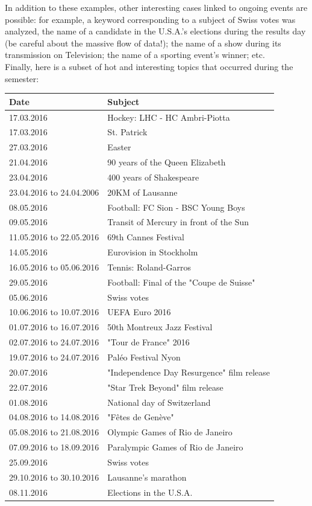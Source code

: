 \documentclass[a4paper,11pt]{report}
\begin{document}
In addition to these examples, other interesting cases linked to ongoing events are possible: for example, a keyword corresponding to a subject of Swiss votes was analyzed, the name of a candidate in the U.S.A.'s elections during the results day (be careful about the massive flow of data!); the name of a show during its transmission on Television; the name of a sporting event's winner; etc.\\

Finally, here is a subset of hot and interesting topics that occurred during the semester:
\vspace{-10pt}
\begin{center}
\def\arraystretch{1.5}
\begin{longtable}{|l|l|}\hline
	\textbf{Date} & \textbf{Subject}\\\hline \endhead
	17.03.2016 & Hockey: LHC - HC Ambri-Piotta\\\hline
	17.03.2016 & St. Patrick\\\hline
	27.03.2016 & Easter\\\hline
	21.04.2016 & 90 years of the Queen Elizabeth\\\hline
	23.04.2016 & 400 years of Shakespeare\\\hline
	23.04.2016 to 24.04.2006 & 20KM of Lausanne\\\hline
	08.05.2016 & Football: FC Sion - BSC Young Boys\\\hline
	09.05.2016 & Transit of Mercury in front of the Sun\\\hline
	11.05.2016 to 22.05.2016 & 69th Cannes Festival\\\hline
	14.05.2016 & Eurovision in Stockholm\\\hline
	16.05.2016 to 05.06.2016 & Tennis: Roland-Garros\\\hline
	29.05.2016 & Football: Final of the "Coupe de Suisse"\\\hline
	05.06.2016 & Swiss votes\\\hline
	10.06.2016 to 10.07.2016 & UEFA Euro 2016\\\hline
	01.07.2016 to 16.07.2016 & 50th Montreux Jazz Festival\\\hline
	02.07.2016 to 24.07.2016 & "Tour de France" 2016\\\hline
	19.07.2016 to 24.07.2016 & Paléo Festival Nyon\\\hline
	20.07.2016 & "Independence Day Resurgence" film release\\\hline
	22.07.2016 & "Star Trek Beyond" film release\\\hline
	01.08.2016 & National day of Switzerland\\\hline
	04.08.2016 to 14.08.2016 & "Fêtes de Genève"\\\hline
	05.08.2016 to 21.08.2016 & Olympic Games of Rio de Janeiro\\\hline
	07.09.2016 to 18.09.2016 & Paralympic Games of Rio de Janeiro\\\hline
	25.09.2016 & Swiss votes\\\hline
	29.10.2016 to 30.10.2016 & Lausanne's marathon\\\hline
	08.11.2016 & Elections in the U.S.A.\\\hline
\end{longtable}
\end{center}
\end{document}
